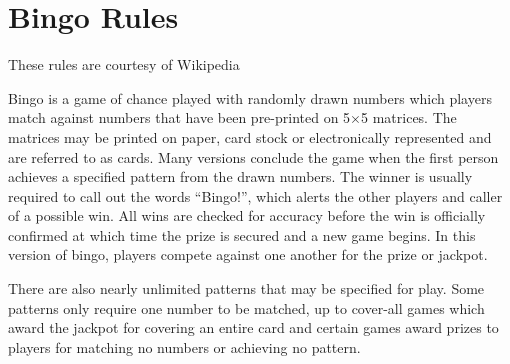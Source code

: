 \section{Bingo Rules}
\label{sec:bingorules}

These rules are courtesy of Wikipedia\cite{website:bingo-rules}

Bingo is a game of chance played with randomly drawn numbers which players
match against numbers that have been pre-printed on 5$\times$5 matrices. The
matrices may be printed on paper, card stock or electronically represented and
are referred to as cards. Many versions conclude the game when the first person
achieves a specified pattern from the drawn numbers. The winner is usually
required to call out the words ``Bingo!'', which alerts the other players and
caller of a possible win. All wins are checked for accuracy before the win is
officially confirmed at which time the prize is secured and a new game begins.
In this version of bingo, players compete against one another for the prize or
jackpot.

There are also nearly unlimited patterns that may be specified for play. Some
patterns only require one number to be matched, up to cover-all games which
award the jackpot for covering an entire card and certain games award prizes
to players for matching no numbers or achieving no pattern.
